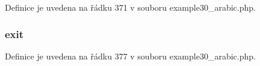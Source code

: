Definice je uvedena na řádku 371 v souboru example30\-\_\-arabic.\-php.

\hypertarget{example30__arabic_8php_a6733eb5f605d09eaede9845835d71c4e}{
\subsubsection[{exit}]{\setlength{\rightskip}{0pt plus 5cm}exit}}\label{example30__arabic_8php_a6733eb5f605d09eaede9845835d71c4e}


Definice je uvedena na řádku 377 v souboru example30\-\_\-arabic.\-php.

